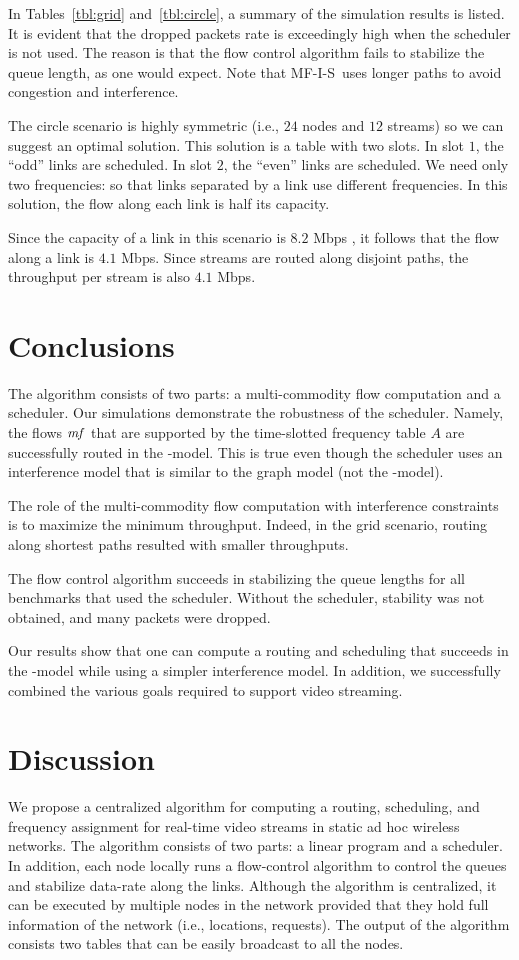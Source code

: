 \documentclass[12pt]{article}
\newenvironment{proof sketch}[1]{\noindent {\emph{Proof sketch of #1:}}}{\hfill \qed}
\newcommand{\SINR}{\text{\sc{sinr}}}
\newcommand{\mf}{\text{\emph{mf}}}
\newcommand{\algA}{\textsc{MF-I-S}}
\begin{document}
In Tables~\ref{tbl:grid} and~\ref{tbl:circle}, a summary of the
simulation results is listed. It is evident that the dropped packets
rate is exceedingly high when the scheduler is not used. The reason is
that the flow control algorithm fails to stabilize the queue length, as
one would expect.  Note that \algA\ uses longer paths to avoid
congestion and interference.

The circle scenario is highly symmetric (i.e., $24$ nodes and $12$
streams) so we can suggest an optimal solution.  This solution is a
table with two slots.  In slot $1$, the ``odd'' links are scheduled.
In slot $2$, the ``even'' links are scheduled.  We need only two
frequencies: so that links separated by a link use different
frequencies.
In this solution, the flow along each link is half its capacity.

Since the capacity of a link in this scenario is $8.2$ Mbps , it follows that
the flow along a link is $4.1$ Mbps. Since streams are routed along
disjoint paths, the throughput per stream is also $4.1$ Mbps.


  
\section{Conclusions}
The algorithm consists of two parts: a multi-commodity flow
computation and a scheduler.  Our simulations demonstrate the
robustness of the scheduler.  Namely, the flows $\mf$ that are
supported by the time-slotted frequency table $A$ are successfully
routed in the \SINR-model. This is true even though the scheduler uses
an interference model that is similar to the graph model (not the \SINR-model).

The role of the multi-commodity flow computation with interference
constraints is to maximize the minimum throughput. Indeed, in the grid scenario, routing
along shortest paths resulted with smaller throughputs.

The flow control algorithm succeeds in stabilizing the queue lengths
for all benchmarks that used the scheduler. Without the scheduler,
stability was not obtained, and many packets were dropped.

Our results show that one can compute a routing and scheduling that
succeeds in the \SINR-model while using a simpler interference model.
In addition, we successfully combined the various goals required to
support video streaming.

\section{Discussion}
We propose a centralized algorithm for computing a routing,
scheduling, and frequency assignment for real-time video streams in
static ad hoc wireless networks.  The algorithm consists of two parts:
a linear program and a scheduler.  In addition, each node locally runs
a flow-control algorithm to control the queues and stabilize data-rate
along the links.  Although the algorithm is centralized, it can be
executed by multiple nodes in the network provided that they hold full
information of the network (i.e., locations, requests).  The output of
the algorithm consists two tables that can be easily broadcast to all the
nodes.
\end{document}

